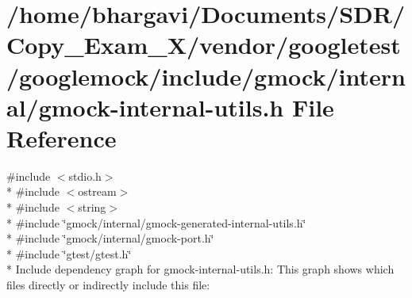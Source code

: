 \hypertarget{gmock-internal-utils_8h}{}\section{/home/bhargavi/\+Documents/\+S\+D\+R/\+Copy\+\_\+\+Exam\+\_\+X/vendor/googletest/googlemock/include/gmock/internal/gmock-\/internal-\/utils.h File Reference}
\label{gmock-internal-utils_8h}
{\ttfamily \#include $<$stdio.\+h$>$}\\*
{\ttfamily \#include $<$ostream$>$}\\*
{\ttfamily \#include $<$string$>$}\\*
{\ttfamily \#include \char`\"{}gmock/internal/gmock-\/generated-\/internal-\/utils.\+h\char`\"{}}\\*
{\ttfamily \#include \char`\"{}gmock/internal/gmock-\/port.\+h\char`\"{}}\\*
{\ttfamily \#include \char`\"{}gtest/gtest.\+h\char`\"{}}\\*
Include dependency graph for gmock-\/internal-\/utils.h\+:
This graph shows which files directly or indirectly include this file\+:

